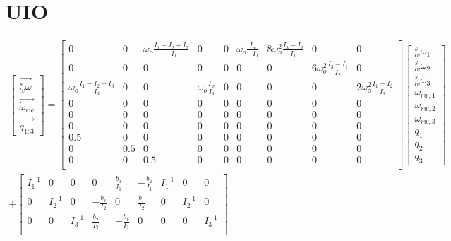 \chapter{UIO}

\tiny
\begin{align}
\begin{bmatrix}
\vec{_{lv}^s\dot{\omega}} \\
\vec{\dot{\omega}_{rw} } \\
\vec{\dot{q}_{1:3}}
\end{bmatrix} 
\nonumber
= \begin{bmatrix}
0 & 0 & \omega_o\frac{I_1 - I_2 + I_3}{-I_1} & 0 & 0 & \omega_o\frac{I_w}{-I_1} & 8\omega_o^2\frac{I_3 - I_2}{I_1} & 0 & 0 \\
0 & 0 &	0 & 0 & 0 &	0 & 0 &  6\omega_o^2\frac{I_3 - I_1}{I_2} & 0\\
\omega_o\frac{I_1 - I_2 + I_3}{I_3}  & 0 & 0 &  \omega_o\frac{I_w}{I_3} & 0 &	0 & 0 & 0 & 2\omega_o^2\frac{I_1 - I_2}{I_3}\\
0 & 0 &	0  & 0 & 0 & 0 & 0 & 0 & 0\\
0 & 0 &	0  & 0 & 0 & 0 & 0 & 0 & 0 \\
0 & 0 &	0 & 0 & 0 & 0 & 0 & 0 & 0\\
0.5 & 0 &	0 & 0 & 0 & 0 & 0 & 0 & 0 \\
0 & 0.5 &	0& 0 & 0 & 0 & 0 & 0 & 0 \\
0 & 0 &	0.5 & 0 & 0 & 0 & 0 & 0 & 0\\
\end{bmatrix}
\begin{bmatrix}
_{lv}^s\omega_1 \\
_{lv}^s\omega_2 \\
_{lv}^s\omega_3 \\
\omega_{rw,1} \\
\omega_{rw,2} \\
\omega_{rw,3} \\
q_1 \\
q_2 \\
q_3 
\end{bmatrix}
\\
\nonumber
+
\begin{bmatrix}
I_1^{-1} & 0 & 0 & 0 & \frac{b_3}{I_1} & -\frac{b_2}{I_1}	& I_1^{-1} & 0 & 0\\
0 & I_2^{-1} & 0 & - \frac{b_3}{I_2} & 0 &  \frac{b_1}{I_2} & 0 & I_2^{-1} & 0\\ 
0 & 0 & I_3^{-1} &  \frac{b_2}{I_3} &  -\frac{b_1}{I_3} & 0 & 0 & 0 & I_3^{-1} \\  

\end{bmatrix}
\end{align}
